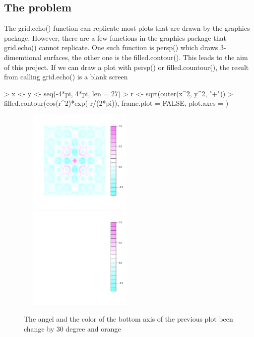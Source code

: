\documentclass[a4paper,10pt]{article}
\begin{document}
\subsection{The problem}
The grid.echo() function can replicate most plots that are drawn by the graphics package. However, there are a few functions in the graphics package that grid.echo() cannot replicate. One such function is persp() which draws 3-dimemtional surfaces, the other one is the filled.contour(). This leads to the aim of this project. If we can draw a plot with persp() or filled.countour(), the result from calling grid.echo() is a blank screen 

\begin{Schunk}
\begin{Sinput}
> x <- y <- seq(-4*pi, 4*pi, len = 27)
> r <- sqrt(outer(x^2, y^2, "+"))
> filled.contour(cos(r^2)*exp(-r/(2*pi)), frame.plot = FALSE, plot.axes = {})
\end{Sinput}
\end{Schunk}

\begin{figure}[H]
\begin{center}
  \includegraphics[height = 5cm, width = 6cm]{figure/filled-contour.pdf}
  \includegraphics[height = 5cm, width = 6cm]{figure/filled-contour-gridecho.pdf}
  \caption{The angel and the color of the bottom axis of the previous plot been change by 30 degree and orange}
  	\label{figure3}
\end{center}
\end{figure}
\end{document}
